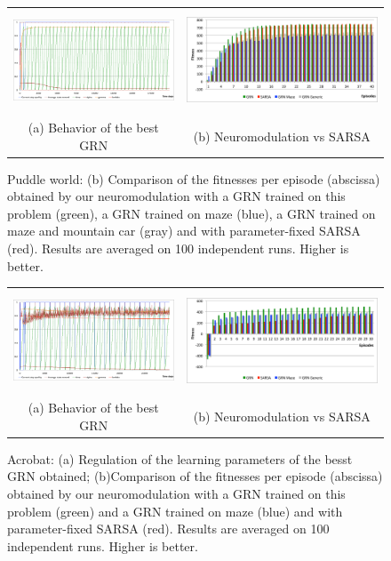 \begin{figure}[t!]
\center
\begin{tabular}{cc}
\includegraphics[height=3cm]{PW_GRNBehavior.pdf} &
\includegraphics[height=3cm]{PW_GRNvsSARSA.pdf} \\
(a) Behavior of the best GRN &
(b) Neuromodulation vs SARSA
\end{tabular}
\caption{Puddle world: (b) Comparison of the fitnesses per episode (abscissa) obtained by our neuromodulation with a GRN trained on this problem (green), a GRN trained on maze (blue), a GRN trained on maze and mountain car (gray) and with parameter-fixed SARSA (red). Results are averaged on 100 independent runs. Higher is better.}\label{fig:PW:Results}
\end{figure}

\begin{figure}[b!]
\center
\begin{tabular}{cc}
\includegraphics[height=3cm]{ACP_GRNBehavior.pdf} &
\includegraphics[height=3cm]{ACP_GRNvsSARSA.pdf} \\
(a) Behavior of the best GRN &
(b) Neuromodulation vs SARSA
\end{tabular}
\caption{Acrobat: (a) Regulation of the learning parameters of the besst GRN obtained; (b)Comparison of the fitnesses per episode (abscissa) obtained by our neuromodulation with a GRN trained on this problem (green) and a GRN trained on maze (blue) and with parameter-fixed SARSA (red). Results are averaged on 100 independent runs. Higher is better. }\label{fig:ACP:Results}
\end{figure}

